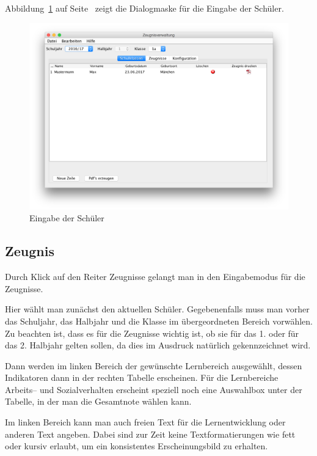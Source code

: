 \documentclass[a4paper,notitlepage,parskip]{scrartcl}
\newcommand\ott{\normalfont\ttfamily}
\begin{document}
Abbildung~\ref{fig:Schulklassen} auf Seite~\pageref{fig:Schulklassen} zeigt die Dialogmaske für die Eingabe der Schüler.

\begin{figure}[ht]
\centering
\centerline{\includegraphics[width=1.0\textwidth]{Schulklassen}}
\caption{Eingabe der Schüler}
\label{fig:Schulklassen}
\end{figure}

\subsection{Zeugnis}
Durch Klick auf den Reiter {\ott Zeugnisse} gelangt man in den Eingabemodus für die Zeugnisse.

Hier wählt man zunächst den aktuellen Schüler.
Gegebenenfalls muss man vorher das Schuljahr, das Halbjahr und die Klasse im übergeordneten Bereich vorwählen.
Zu beachten ist, dass es für die Zeugnisse wichtig ist, ob sie für das 1. oder für das 2. Halbjahr gelten sollen,
da dies im Ausdruck natürlich gekennzeichnet wird.

Dann werden im linken Bereich der gewünschte Lernbereich ausgewählt, dessen Indikatoren dann in der rechten Tabelle erscheinen.
Für die Lernbereiche Arbeits-- und Sozialverhalten erscheint speziell noch eine Auswahlbox unter der Tabelle, in der man die Gesamtnote wählen kann. 

Im linken Bereich kann man auch freien Text für die Lernentwicklung oder anderen Text angeben. Dabei sind zur Zeit keine Textformatierungen wie fett oder kursiv erlaubt, um ein konsistentes Erscheinungsbild zu erhalten.
\end{document}
